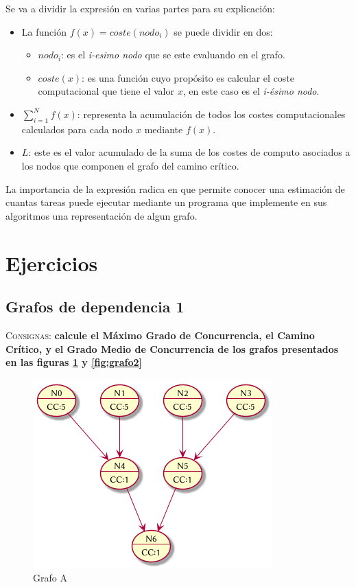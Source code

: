 \documentclass{article}
\begin{document}
Se va a dividir la expresi\'on en varias partes para su explicaci\'on:
\begin{itemize}
\item La funci\'on $f(x)=coste(nodo_{i})$ se puede dividir en dos:
	\begin{itemize}
	\item $nodo_{i}$: es el \textit{i-esimo nodo} que se este evaluando en el grafo.
	\item $coste(x)$: es una funci\'on cuyo prop\'osito es calcular el coste
computacional que tiene el valor $x$, en este caso es el \textit{i-\'esimo
nodo}.
\end{itemize}
\item $\sum_{i=1}^{N} f(x)$: representa la acumulaci\'on de todos los costes
computacionales calculados para cada nodo $x$ mediante $f(x)$.
\item $L$: este es el valor acumulado de la suma de los costes de computo
asociados a los nodos que componen el grafo del camino cr\'itico.
\end{itemize}

La importancia de la expresi\'on radica en que permite conocer una estimaci\'on
de cuantas tareas puede ejecutar mediante un programa que implemente en sus algoritmos
una representaci\'on de algun grafo.

\section{Ejercicios}
\subsection{Grafos de dependencia 1}
\textsc{Consignas}: \textbf{calcule el M\'aximo Grado de Concurrencia, el
Camino Cr\'itico, y el Grado Medio de Concurrencia de los grafos presentados en
las figuras \ref{fig:grafo1} y \ref{fig:grafo2}}\\

\begin{figure}[H]
  \centering
  \includegraphics[width=.4\linewidth]{grafo1}
  \caption{Grafo A}
  \label{fig:grafo1}
\end{figure}
\end{document}
